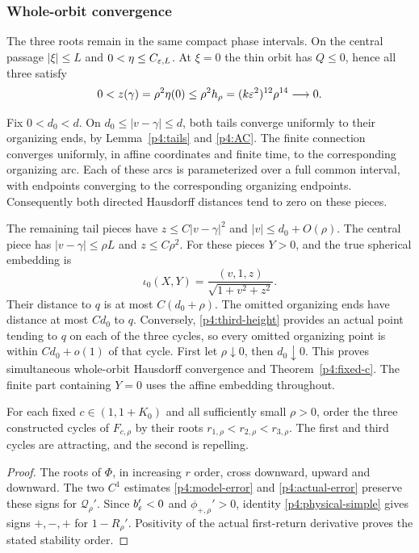 \subsubsection{Whole-orbit convergence}

The three roots remain in the same compact phase intervals.
On the central passage $|\xi|\le L$ and $0<\eta\le C_{\varepsilon,L}$.
At $\xi=0$ the thin orbit has $Q\le0$, hence all three satisfy
\begin{equation}\label{p4:third-height}
 0<z(\gamma)=\rho^2\eta(0)
 \le\rho^2h_\rho=(k\varepsilon^2)^{12}\rho^{14}\longrightarrow0.
\end{equation}

Fix $0<d_0<d$. On $d_0\le|v-\gamma|\le d$, both tails converge
uniformly to their organizing ends, by Lemma~\ref{p4:tails} and
\eqref{p4:AC}. The finite connection converges uniformly, in affine
coordinates and finite time, to the corresponding organizing arc.
Each of these arcs is parameterized over a full common interval,
with endpoints converging to the corresponding organizing endpoints.
Consequently both directed Hausdorff distances tend to zero on
these pieces.

The remaining tail pieces have $z\le C|v-\gamma|^2$ and
$|v|\le d_0+O(\rho)$.
The central piece has $|v-\gamma|\le\rho L$ and $z\le C\rho^2$.
For these pieces $Y>0$, and the true spherical embedding is
\[
 \iota_0(X,Y)=\frac{(v,1,z)}{\sqrt{1+v^2+z^2}}.
\]
Their distance to $q$ is at most $C(d_0+\rho)$.
The omitted organizing ends have distance at most $Cd_0$ to $q$.
Conversely, \eqref{p4:third-height} provides an actual point tending
to $q$ on each of the three cycles, so every omitted organizing
point is within $C d_0+o(1)$ of that cycle.
First let $\rho\downarrow0$, then $d_0\downarrow0$.
This proves simultaneous whole-orbit Hausdorff convergence and
Theorem~\ref{p4:fixed-c}. The finite part containing $Y=0$
uses the affine embedding throughout.

\begin{corollary}\label{p4:stability-order}
For each fixed $c\in(1,1+K_0)$ and all sufficiently small $\rho>0$,
order the three constructed cycles of $F_{c,\rho}$ by their roots
$r_{1,\rho}<r_{2,\rho}<r_{3,\rho}$. The first and third cycles
are attracting, and the second is repelling.
\end{corollary}
\begin{proof}
The roots of \(\Phi\), in increasing \(r\) order, cross downward,
upward and downward. The two \(C^1\) estimates
\eqref{p4:model-error} and \eqref{p4:actual-error} preserve these
signs for \(\mathcal Q_\rho'\). Since \(b_\varepsilon'<0\) and
\(\phi_{+,\rho}'>0\), identity \eqref{p4:physical-simple} gives
signs \(+,-,+\) for \(1-R_\rho'\). Positivity of the actual
first-return derivative proves the stated stability order.
\end{proof}

